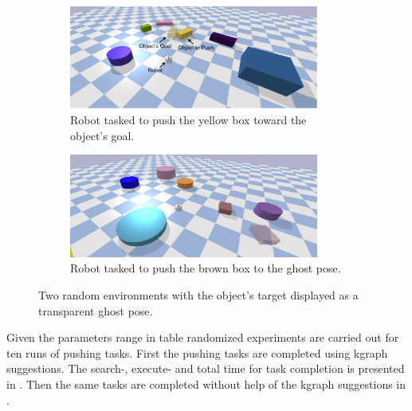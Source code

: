 \begin{figure}[H]
    \centering
    \begin{subfigure}{\textwidth}
    \centering
    \includegraphics[width=0.9\textwidth]{figures/results/random_1.drawio}
    \caption{Robot tasked to push the yellow box toward the object's goal.}
    \end{subfigure}

    \vspace{0.2cm}
    \begin{subfigure}{\textwidth}
    \centering
    \includegraphics[width=0.9\textwidth]{figures/results/random_2}
    \caption{Robot tasked to push the brown box to the ghost pose.}
    \end{subfigure}
    \caption{Two random environments with the object's target displayed as a transparent ghost pose.}%
    \label{fig:random_environnment}
\end{figure}

Given the parameters range in table  randomized experiments are carried out for ten runs of pushing tasks. First the pushing tasks are completed using \ac{kgraph} suggestions. The search-, execute- and total time for task completion is presented in . Then the same tasks are completed without help of the \ac{kgraph} suggestions in . 

